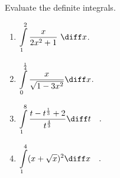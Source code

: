 Evaluate the definite integrals.
\begin{multicols}{2}
\begin{enumerate}
\item $\displaystyle\int\limits_{1}^{2} \frac{x}{2x^2+1 }  ~\diff x$.

\item $\displaystyle\int\limits_{0}^{\frac{1}4}\frac{x }{\sqrt{1-3x^2}}\diff x$.


\item $\displaystyle\int\limits_{1}^{8} \frac{t-t^{\frac{1}{3}} +2}{t^{ \frac{4}{3 } } } \diff t\quad .$

\item $\displaystyle\int\limits_{1}^{4} (x+\sqrt{x})^2 \diff x\quad .$


\end{enumerate}
\end{multicols}
